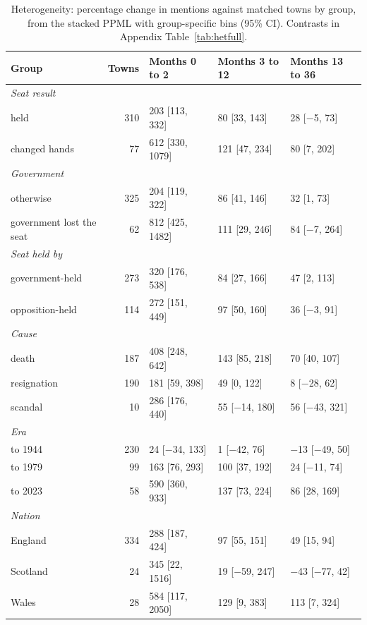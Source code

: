 \documentclass[11pt,a4paper]{article}
\begin{document}
\begin{table}[tbp]\centering\footnotesize\caption{Heterogeneity: percentage change in mentions against matched towns by group, from the stacked PPML with group-specific bins (95\% CI). Contrasts in Appendix Table~\ref{tab:hetfull}.}\label{tab:het}\begin{tabular}{lrlll}\toprule Group & Towns & Months 0 to 2 & Months 3 to 12 & Months 13 to 36\\\midrule
\multicolumn{5}{l}{\textit{Seat result}}\\
\quad held & 310 & 203 [113, 332] & 80 [33, 143] & 28 [$-$5, 73]\\
\quad changed hands & 77 & 612 [330, 1079] & 121 [47, 234] & 80 [7, 202]\\
\multicolumn{5}{l}{\textit{Government}}\\
\quad otherwise & 325 & 204 [119, 322] & 86 [41, 146] & 32 [1, 73]\\
\quad government lost the seat & 62 & 812 [425, 1482] & 111 [29, 246] & 84 [$-$7, 264]\\
\multicolumn{5}{l}{\textit{Seat held by}}\\
\quad government-held & 273 & 320 [176, 538] & 84 [27, 166] & 47 [2, 113]\\
\quad opposition-held & 114 & 272 [151, 449] & 97 [50, 160] & 36 [$-$3, 91]\\
\multicolumn{5}{l}{\textit{Cause}}\\
\quad death & 187 & 408 [248, 642] & 143 [85, 218] & 70 [40, 107]\\
\quad resignation & 190 & 181 [59, 398] & 49 [0, 122] & 8 [$-$28, 62]\\
\quad scandal & 10 & 286 [176, 440] & 55 [$-$14, 180] & 56 [$-$43, 321]\\
\multicolumn{5}{l}{\textit{Era}}\\
\quad 1911 to 1944 & 230 & 24 [$-$34, 133] & 1 [$-$42, 76] & $-$13 [$-$49, 50]\\
\quad 1945 to 1979 & 99 & 163 [76, 293] & 100 [37, 192] & 24 [$-$11, 74]\\
\quad 1980 to 2023 & 58 & 590 [360, 933] & 137 [73, 224] & 86 [28, 169]\\
\multicolumn{5}{l}{\textit{Nation}}\\
\quad England & 334 & 288 [187, 424] & 97 [55, 151] & 49 [15, 94]\\
\quad Scotland & 24 & 345 [22, 1516] & 19 [$-$59, 247] & $-$43 [$-$77, 42]\\
\quad Wales & 28 & 584 [117, 2050] & 129 [9, 383] & 113 [7, 324]\\

\end{tabular}
\end{table}
\end{document}
